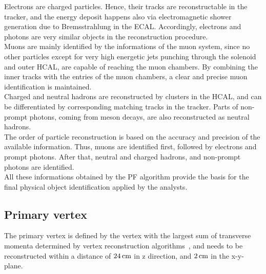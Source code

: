 Electrons are charged particles. Hence, their tracks are reconstructable in the tracker, and the energy deposit happens also via electromagnetic shower generation due to Bremsstrahlung in the ECAL. Accordingly, electrons and photons are very similar objects in the reconstruction procedure.\\
Muons are mainly identified by the informations of the muon system, since no other particles except for very high energetic jets punching through the solenoid and outer HCAL, are capable of reaching the muon chambers. By combining the inner tracks with the entries of the muon chambers, a clear and precise muon identification is maintained.\\
Charged and neutral hadrons are reconstructed by clusters in the HCAL, and can be differentiated by corresponding matching tracks in the tracker. Parts of non-prompt photons, \eg coming from meson decays, are also reconstructed as neutral hadrons.\\
The order of particle reconstruction is based on the accuracy and precision of the available information. Thus, muons are identified first, followed by electrons and prompt photons. After that, neutral and charged hadrons, and non-prompt photons are identified.\\
All these informations obtained by the PF algorithm provide the basis for the final physical object identification applied by the analysts.

\subsection{Primary vertex}
The primary vertex is defined by the vertex with the largest sum of transverse momenta determined by vertex reconstruction algorithms~\cite{vertex}, and needs to be reconstructed within a distance of $24\,\text{cm}$ in z direction, and $2\,\text{cm}$ in the x-y-plane.



